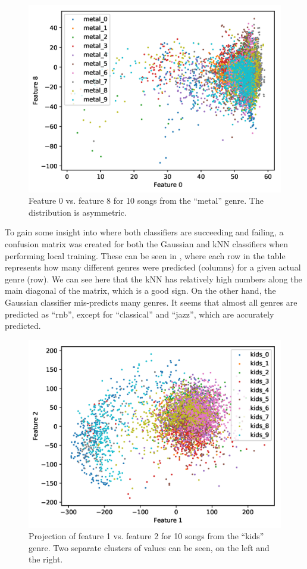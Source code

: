 \documentclass[a4paper,titlepage]{article}
\begin{document}
	\begin{figure}[!htb]
		\centering
		\includegraphics[width=\columnwidth]{plots/metal_non_symmetric.png}
		\caption
		{Feature 0 vs. feature 8 for 10 songs from the ``metal'' genre. The distribution is asymmetric.}
		\label{fig:metal_non_symmetric}
	\end{figure}
	
	To gain some insight into where both classifiers are succeeding and failing, a confusion matrix was created for both the Gaussian and kNN classifiers when performing local training. These can be seen in , where each row in the table represents how many different genres were predicted (columns) for a given actual genre (row). We can see here that the kNN has relatively high numbers along the main diagonal of the matrix, which is a good sign. On the other hand, the Gaussian classifier mis-predicts many genres. It seems that almost all genres are predicted as ``rnb'', except for ``classical'' and ``jazz'', which are accurately predicted.
	
	\begin{figure}[!htb]
		\centering
		\includegraphics[width=\columnwidth]{plots/kids_cluster.png}
		\caption
		{Projection of feature 1 vs. feature 2 for 10 songs from the ``kids'' genre. Two separate clusters of values can be seen, on the left and the right.}
		\label{fig:kids_cluster}
	\end{figure}
	
\end{document}
